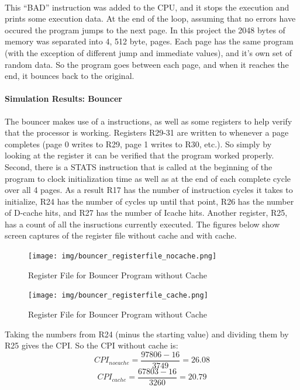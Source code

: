 \documentclass[11pt,letterpaper,]{article}
\begin{document}
\paragraph{}
This ``BAD'' instruction was added to the CPU, and it stops the execution and prints some execution data.  At the end of the loop, assuming that no errors have occured the program jumps to the next page.  In this project the 2048 bytes of memory was separated into 4, 512 byte, pages.  Each page has the same program (with the exception
of different jump and immediate values), and it's own set of random data.  So the program goes between each page, and when it reaches the end, it bounces back to the original.

\paragraph{ Simulation Results: Bouncer }
The bouncer makes use of a instructions, as well as some registers to help verify that the processor is working.  Registers R29-31 are written to whenever a page completes (page 0 writes to R29, page 1 writes to R30, etc.).  So simply by looking at the register it can be verified that the program worked properly.  Second, there is a 
STATS instruction that is called at the beginning of the program to clock initialization time as well as at the end of each complete cycle over all 4 pages.  As a result R17 has the number of instruction cycles it takes to initialize, R24 has the number of cycles up until that point, R26 has the number of D-cache hits, and R27 has the number of Icache hits.  Another register, R25, has a count of all the insructions currently executed. The figures below show screen captures of the register file without cache and with cache.
\begin{figure}[ht]
  \centering
  \texttt{[image: img/bouncer\_registerfile\_nocache.png]}
  \caption{Register File for Bouncer Program without Cache}
  \label{fig:datapath}
\end{figure}
  
\begin{figure}[ht]
  \centering
  \texttt{[image: img/bouncer\_registerfile\_cache.png]}
  \caption{Register File for Bouncer Program without Cache}
  \label{fig:datapath}
\end{figure}
  
Taking the numbers from R24 (minus the starting value) and dividing them by R25 gives the CPI.  So the CPI without cache is: 
$$CPI_{nocache} = \frac{97806 - 16}{3749} = 26.08$$
$$CPI_{cache} = \frac{67803 - 16}{3260} = 20.79$$
\end{document}
